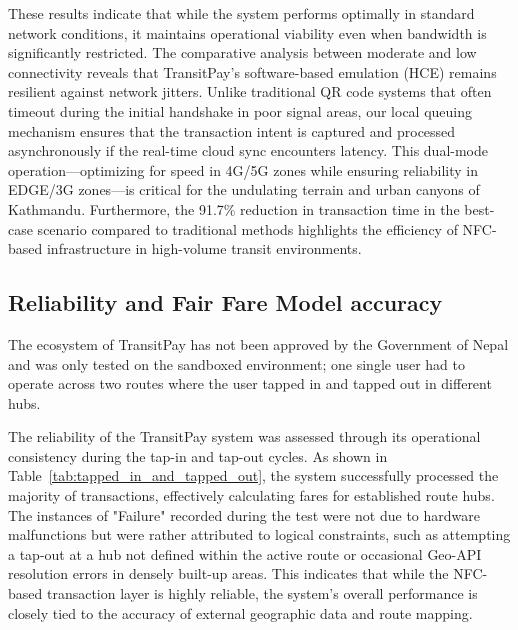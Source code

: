 \documentclass[sigconf, nonacm]{acmart}
\begin{document}
These results indicate that while the system performs optimally in standard network conditions, it maintains operational viability even when bandwidth is significantly restricted. The comparative analysis between moderate and low connectivity reveals that TransitPay's software-based emulation (HCE) remains resilient against network jitters. Unlike traditional QR code systems that often timeout during the initial handshake in poor signal areas, our local queuing mechanism ensures that the transaction intent is captured and processed asynchronously if the real-time cloud sync encounters latency. This dual-mode operation—optimizing for speed in 4G/5G zones while ensuring reliability in EDGE/3G zones—is critical for the undulating terrain and urban canyons of Kathmandu. Furthermore, the 91.7\% reduction in transaction time in the best-case scenario compared to traditional methods highlights the efficiency of NFC-based infrastructure in high-volume transit environments.

\subsection{Reliability and Fair Fare Model accuracy}

The ecosystem of TransitPay has not been approved by the Government of Nepal and was only tested on the sandboxed environment; one single user had to operate across two routes where the user tapped in and tapped out in different hubs.

The reliability of the TransitPay system was assessed through its operational consistency during the tap-in and tap-out cycles. As shown in Table~\ref{tab:tapped_in_and_tapped_out}, the system successfully processed the majority of transactions, effectively calculating fares for established route hubs. The instances of "Failure" recorded during the test were not due to hardware malfunctions but were rather attributed to logical constraints, such as attempting a tap-out at a hub not defined within the active route or occasional Geo-API resolution errors in densely built-up areas. This indicates that while the NFC-based transaction layer is highly reliable, the system's overall performance is closely tied to the accuracy of external geographic data and route mapping.
\end{document}
